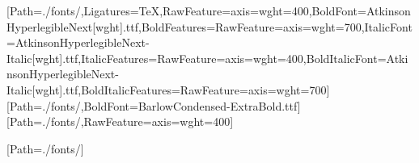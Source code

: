 
\usepackage{fontspec}
\usepackage{unicode-math}
\usepackage{etoolbox}
\usepackage{titling}
\usepackage[x11names]{xcolor}

\setmainfont{AtkinsonHyperlegibleNext[wght].ttf}[Path=./fonts/,Ligatures=TeX,RawFeature={axis={wght=400}},BoldFont=AtkinsonHyperlegibleNext[wght].ttf,BoldFeatures={RawFeature={axis={wght=700}}},ItalicFont=AtkinsonHyperlegibleNext-Italic[wght].ttf,ItalicFeatures={RawFeature={axis={wght=400}}},BoldItalicFont=AtkinsonHyperlegibleNext-Italic[wght].ttf,BoldItalicFeatures={RawFeature={axis={wght=700}}}]
\setsansfont{BarlowCondensed-Bold.ttf}[Path=./fonts/,BoldFont=BarlowCondensed-ExtraBold.ttf]
\setmonofont{AtkinsonHyperlegibleNext[wght].ttf}[Path=./fonts/,RawFeature={axis={wght=400}}]

\newfontfamily{}[Path=./fonts/]

\usepackage{geometry}
\geometry{margin=1in}

\usepackage{microtype}

\usepackage{setspace}

\setlength{\parindent}{0pt}
\setlength{\parskip}{4.5pt}

\usepackage{enumitem}

\providecommand{\tightlist}{%
  \setlength{\itemsep}{0pt}%
  \setlength{\parskip}{0pt}%
  \setlength{\parsep}{0pt}%
}


